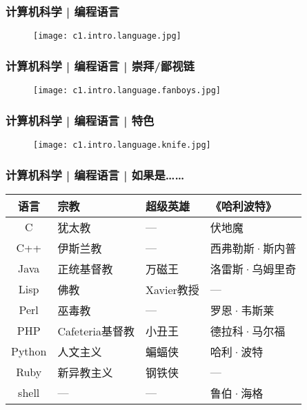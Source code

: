 \begin{frame}
  \frametitle{计算机科学 | 编程语言}
  \begin{figure}
    \centering
    \texttt{[image: c1.intro.language.jpg]}
  \end{figure}
\end{frame}

\begin{frame}
  \frametitle{计算机科学 | 编程语言 | 崇拜/鄙视链}
  \begin{figure}
    \centering
    \texttt{[image: c1.intro.language.fanboys.jpg]}
  \end{figure}
\end{frame}

\begin{frame}
  \frametitle{计算机科学 | 编程语言 | 特色}
  \begin{figure}
    \centering
    \texttt{[image: c1.intro.language.knife.jpg]}
  \end{figure}
\end{frame}

\begin{frame}
  \frametitle{计算机科学 | 编程语言 | 如果是……}
  \begin{table}
    \centering
    \begin{tabular}{clll}
      \hline
      \rowcolor{blue!50}语言 & 宗教 & 超级英雄 & 《哈利波特》\\
      \hline
      C & 犹太教 & --- & 伏地魔\\
      C++ & 伊斯兰教 & --- & 西弗勒斯·斯内普\\
      Java & 正统基督教 & 万磁王 & 洛雷斯·乌姆里奇\\
      Lisp & 佛教 & Xavier教授 & ---\\
      Perl & 巫毒教 & --- & 罗恩·韦斯莱\\
      PHP & Cafeteria基督教 & 小丑王 & 德拉科·马尔福\\
      Python & 人文主义 & 蝙蝠侠 & 哈利·波特\\
      Ruby & 新异教主义 & 钢铁侠 & ---\\
      shell & --- & --- & 鲁伯·海格\\
      \hline
    \end{tabular}
  \end{table}
\end{frame}

